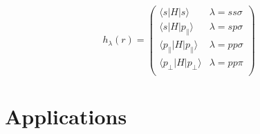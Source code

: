\documentclass[%
 reprint,
 amsmath,amssymb,
 aps,
rmp,
]{revtex4-1}
\begin{document}
\begin{equation}
h_{\lambda}(r) = \begin{pmatrix}
\langle s|H|s \rangle & \lambda = ss\sigma \\
\langle s|H|p_\parallel \rangle & \lambda = sp\sigma \\
\langle p_\parallel|H|p_\parallel \rangle & \lambda = pp\sigma \\
\langle p_{\perp}|H|p_{\perp} \rangle & \lambda = pp\pi \\
\end{pmatrix}
\end{equation}

\section{Applications}
\end{document}
